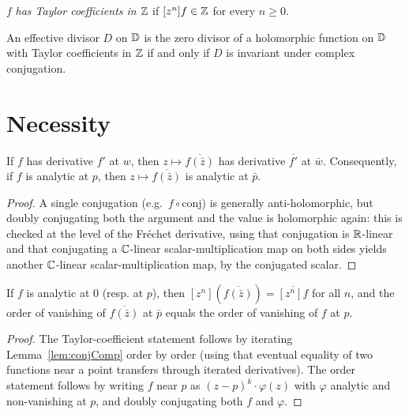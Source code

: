 \begin{definition}
  \label{def:hasIntCoeffs}
  \leanok
  $f$ \emph{has Taylor coefficients in $\mathbb{Z}$} if $[z^n]f \in \mathbb{Z}$ for
  every $n \ge 0$.
\end{definition}

\begin{theorem}
  \label{thm:main}
  \leanok
  An effective divisor $D$ on $\mathbb{D}$ is the zero divisor of a holomorphic
  function on $\mathbb{D}$ with Taylor coefficients in $\mathbb{Z}$ if and only if $D$
  is invariant under complex conjugation.
\end{theorem}

\section{Necessity}

\begin{lemma}
  \label{lem:conjComp}
  \leanok
  If $f$ has derivative $f'$ at $w$, then $z \mapsto \overline{f(\bar z)}$
  has derivative $\overline{f'}$ at $\bar w$. Consequently, if $f$ is
  analytic at $p$, then $z \mapsto \overline{f(\bar z)}$ is analytic at
  $\bar p$.
\end{lemma}
\begin{proof}
  \leanok
  A single conjugation (e.g.\ $f \circ \mathrm{conj}$) is generally
  anti-holomorphic, but doubly conjugating both the argument and the
  value is holomorphic again: this is checked at the level of the
  Fr\'echet derivative, using that conjugation is $\mathbb{R}$-linear and that
  conjugating a $\mathbb{C}$-linear scalar-multiplication map on both sides
  yields another $\mathbb{C}$-linear scalar-multiplication map, by the
  conjugated scalar.
\end{proof}

\begin{lemma}
  \label{lem:taylorCoeffConj}
  \leanok
  If $f$ is analytic at $0$ (resp. at $p$), then
  $[z^n](\overline{f(\bar z)}) = \overline{[z^n]f}$ for all $n$, and the
  order of vanishing of $\overline{f(\bar z)}$ at $\bar p$ equals the
  order of vanishing of $f$ at $p$.
\end{lemma}
\begin{proof}
  \leanok
  The Taylor-coefficient statement follows by iterating
  Lemma~\ref{lem:conjComp} order by order (using that eventual equality
  of two functions near a point transfers through iterated derivatives).
  The order statement follows by writing $f$ near $p$ as
  $(z-p)^k \cdot \varphi(z)$ with $\varphi$ analytic and non-vanishing at
  $p$, and doubly conjugating both $f$ and $\varphi$.
\end{proof}

